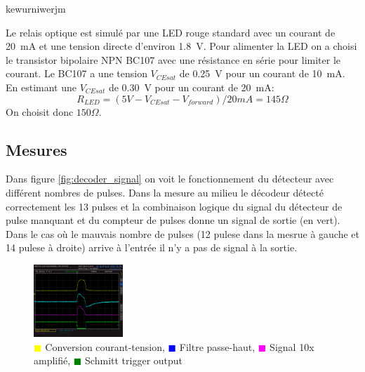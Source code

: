 \documentclass[french]{layout/Report}
\begin{document}
\begin{description}[leftmargin=!,labelwidth=4cm, labelindent=\parindent]
	\item[Déclencheur] kewurniwerjm
	\item[Relais] Le relais optique est simulé par une LED rouge standard avec un courant de \SI{20}{\milli\ampere} et une tension directe d'environ \SI{1.8}{\volt}. Pour alimenter la LED on a choisi le transistor bipolaire NPN BC107 avec une résistance en série pour limiter le courant.
		Le BC107 a une tension \(V_{CEsat}\) de \SI{0.25}{\volt} pour un courant de \SI{10}{\milli\ampere}.
		En estimant une \(V_{CEsat}\) de \SI{0.30}{\volt} pour un courant de \SI{20}{\milli\ampere}:
\begin{equation*}
R_{LED} = (5V - V_{CEsat} - V_{forward})/20mA = 145\Omega
\end{equation*}
On choisit donc \(150\Omega\).


\end{description}
\subsection{Mesures}

Dans figure \ref{fig:decoder_signal} on voit le fonctionnement du détecteur avec différent nombres de pulses.
Dans la mesure au milieu le décodeur détecté correctement les 13 pulses et la combinaison logique
du signal du détecteur de pulse manquant et du compteur de pulses donne un signal de sortie (en vert).
Dans le cas où le mauvais nombre  de pulses (12 pulese dans la mesrue à gauche et 14 pulese à droite)
arrive à l'entrée il n'y a pas de signal à la sortie.

\begin{figure}[h]
\hspace{5mm}
\includegraphics[width=0.3\textwidth]{../measurements/SCR03}
\caption{
\textcolor{yellow}{$\blacksquare$} Conversion courant-tension,
\textcolor{blue}{$\blacksquare$} Filtre passe-haut,
\textcolor{magenta}{$\blacksquare$} Signal 10x amplifié,
\textcolor{green}{$\blacksquare$} Schmitt trigger output
}
\label{fig:filter_signal}
\end{figure}
\end{document}
